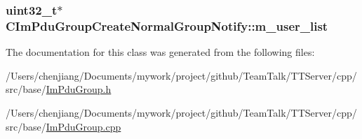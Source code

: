 \subsubsection[{m\+\_\+user\+\_\+list}]{\setlength{\rightskip}{0pt plus 5cm}uint32\+\_\+t$\ast$ C\+Im\+Pdu\+Group\+Create\+Normal\+Group\+Notify\+::m\+\_\+user\+\_\+list\hspace{0.3cm}{\ttfamily [private]}}\label{class_c_im_pdu_group_create_normal_group_notify_ac9cc8ae58942dcf6a4e67f6bfa56780a}


The documentation for this class was generated from the following files\+:\begin{DoxyCompactItemize}
\item 
/\+Users/chenjiang/\+Documents/mywork/project/github/\+Team\+Talk/\+T\+T\+Server/cpp/src/base/\hyperlink{_im_pdu_group_8h}{Im\+Pdu\+Group.\+h}\item 
/\+Users/chenjiang/\+Documents/mywork/project/github/\+Team\+Talk/\+T\+T\+Server/cpp/src/base/\hyperlink{_im_pdu_group_8cpp}{Im\+Pdu\+Group.\+cpp}\end{DoxyCompactItemize}
